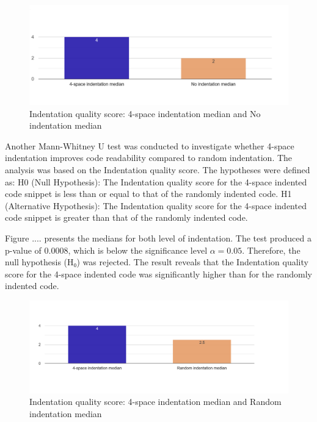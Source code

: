 \begin{figure} [H]
  \centering
  \includegraphics[scale=0.4]{figures/4-0-q5png.png}
  \caption{Indentation quality score: 4-space indentation median and No indentation median}
  \label{fig:AnhangsChor}
\end{figure}


Another Mann-Whitney U test was conducted to investigate whether 4-space indentation improves code readability compared to random indentation. The analysis was based on the Indentation quality score. The hypotheses were defined as:  H0 (Null Hypothesis): The Indentation quality score for the 4-space indented code snippet is less than or equal to that of the randomly indented code. H1 (Alternative Hypothesis): The Indentation quality score for the 4-space indented code snippet is greater than that of the randomly indented code.


Figure .... presents the medians for both level of indentation. 
The test produced a p-value of 0.0008, which is below the significance level \(\alpha = 0.05\). Therefore, the null hypothesis (H₀) was rejected. The result reveals that the Indentation quality score for the 4-space indented code was significantly higher than for the randomly indented code.

\begin{figure} [H]
  \centering
  \includegraphics[scale=0.4]{figures/4-r-q5.png}
  \caption{Indentation quality score: 4-space indentation median and Random indentation median}
  \label{fig:AnhangsChor}
\end{figure}


